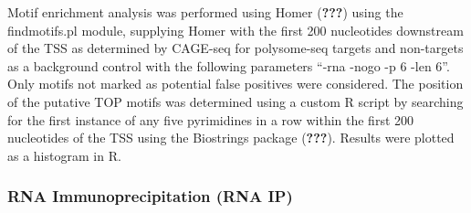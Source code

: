 \documentclass[12pt,oneside]{reedthesis}
\begin{document}
Motif enrichment analysis was performed using Homer ({\textbf{???}}) using the findmotifs.pl module, supplying Homer with the first 200 nucleotides downstream of the TSS as determined by CAGE-seq for polysome-seq targets and non-targets as a background control with the following parameters ``-rna -nogo -p 6 -len 6''. Only motifs not marked as potential false positives were considered. The position of the putative TOP motifs was determined using a custom R script by searching for the first instance of any five pyrimidines in a row within the first 200 nucleotides of the TSS using the Biostrings package ({\textbf{???}}). Results were plotted as a histogram in R.

\hypertarget{rna-immunoprecipitation-rna-ip}{%
\subsubsection{RNA Immunoprecipitation (RNA IP)}\label{rna-immunoprecipitation-rna-ip}}
\end{document}

